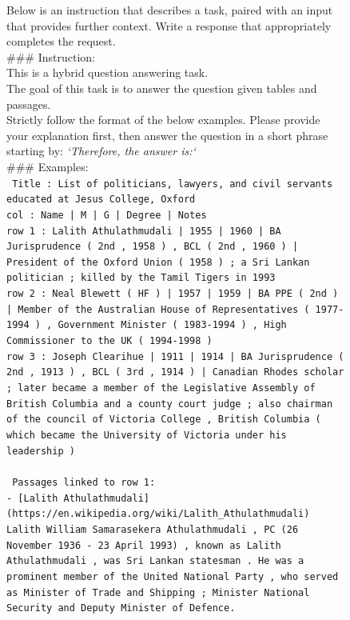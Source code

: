 \newpage
\begin{figure}[htb]

\begin{tcolorbox}
[title = Hybrid Question Answering, colback = gray!10, colframe = black, sharp corners, boxrule=0.5mm]
Below is an instruction that describes a task, paired with an input that provides further context. Write a response that appropriately completes the request.
\\
\#\#\# Instruction: \\
This is a hybrid question answering task. \\
The goal of this task is to answer the question given tables and passages. \\
Strictly follow the format of the below examples. Please provide your explanation first, then answer the question in a short phrase starting by: \textit{`Therefore, the answer is:`}
 \\
\#\#\# Examples: \\
\texttt{
Title : List of politicians, lawyers, and civil servants educated at Jesus College, Oxford \\
col : Name | M | G | Degree | Notes \\
row 1 : Lalith Athulathmudali | 1955 | 1960 | BA Jurisprudence ( 2nd , 1958 ) , BCL ( 2nd , 1960 ) | President of the Oxford Union ( 1958 ) ; a Sri Lankan politician ; killed by the Tamil Tigers in 1993 \\
row 2 : Neal Blewett ( HF ) | 1957 | 1959 | BA PPE ( 2nd ) | Member of the Australian House of Representatives ( 1977-1994 ) , Government Minister ( 1983-1994 ) , High Commissioner to the UK ( 1994-1998 ) \\
row 3 : Joseph Clearihue | 1911 | 1914 | BA Jurisprudence ( 2nd , 1913 ) , BCL ( 3rd , 1914 ) | Canadian Rhodes scholar ; later became a member of the Legislative Assembly of British Columbia and a county court judge ; also chairman of the council of Victoria College , British Columbia ( which became the University of Victoria under his leadership ) \\
}
 \\
\texttt{ 
Passages linked to row 1: \\
- [Lalith Athulathmudali](https://en.wikipedia.org/wiki/Lalith\_Athulathmudali) Lalith William Samarasekera Athulathmudali , PC (26 November 1936 - 23 April 1993) , known as Lalith Athulathmudali , was Sri Lankan statesman . He was a prominent member of the United National Party , who served as Minister of Trade and Shipping ; Minister National Security and Deputy Minister of Defence. \\
}
\end{tcolorbox}
\end{figure}
